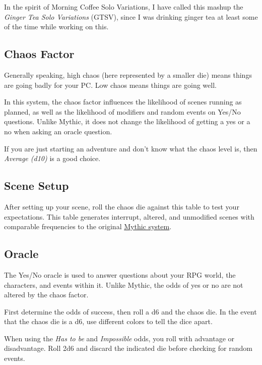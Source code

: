 In the spirit of Morning Coffee Solo Variations, I have called this mashup the
\emph{Ginger Tea Solo Variations} (GTSV), since I was drinking ginger tea at
least some of the time while working on this.

\begin{multicols}{2}
\clearfloat{}

\subsection{Chaos Factor}
Generally speaking, high chaos (here represented by a smaller die) means things
are going badly for your PC\@. Low chaos means things are going well.

In this system, the chaos factor influences the likelihood of scenes running as
planned, as well as the likelihood of modifiers and random events on Yes/No
questions. Unlike Mythic, it does not change the likelihood of getting a yes or
a no when asking an oracle question.

If you are just starting an adventure and don't know what the chaos level is,
then \emph{Average (d10)} is a good choice.



\subsection{Scene Setup}
After setting up your scene, roll the chaos die against this table to test your
expectations. This table generates interrupt, altered, and unmodified scenes
with comparable frequencies to the original
\href{https://www.wordmillgames.com/mythic-gme.html}{Mythic system}.


\subsection{Oracle}
The Yes/No oracle is used to answer questions about your RPG world, the
characters, and events within it. Unlike Mythic, the odds of yes or no are not
altered by the chaos factor.

First determine the odds of success, then roll a d6 and the chaos die. In the
event that the chaos die is a d6, use different colors to tell the dice apart.

\begin{DndReadAloud}{}
When using the \emph{Has to be} and \emph{Impossible} odds, you roll with
advantage or disadvantage. Roll 2d6 and discard the indicated die before
checking for random events.
\end{DndReadAloud}


\vfill

% 
\end{multicols}


